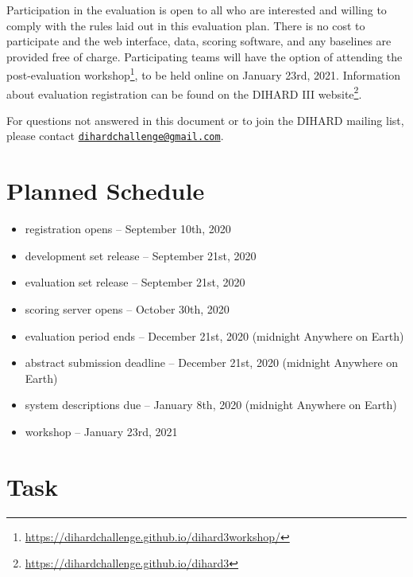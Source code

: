 \documentclass{article}
\newcommand{\email}[1]{\href{mailto:#1}{\nolinkurl{#1}}}
\begin{document}
Participation in the evaluation is open to all who are interested and willing to comply with the rules laid out in this evaluation plan. There is no cost to participate and the web interface, data, scoring software, and any baselines are provided free of charge. Participating teams will have the option of attending the post-evaluation workshop\footnote{\url{https://dihardchallenge.github.io/dihard3workshop/}}, to be held online on January 23rd, 2021. Information about evaluation registration can be found on the DIHARD III website\footnote{\url{https://dihardchallenge.github.io/dihard3}}.

For questions not answered in this document or to join the DIHARD mailing list, please contact \email{dihardchallenge@gmail.com}. 
    
    
    
    
    
    
    
\section{Planned Schedule}
\label{sec:schedule}
	\begin{itemize}
        \item registration opens  -- September 10th, 2020
    	\item development set release  --  September 21st, 2020
    	\item evaluation set release  --  September 21st, 2020
    	\item scoring server opens  --  October 30th, 2020
    	\item evaluation period ends  --  December 21st, 2020 (midnight Anywhere on Earth)
    	\item abstract submission deadline  --  December 21st, 2020 (midnight Anywhere on Earth)
    	\item system descriptions due  --  January 8th, 2020 (midnight Anywhere on Earth)
    	\item workshop  --  January 23rd, 2021
    \end{itemize}

    

\section{Task}
\end{document}
